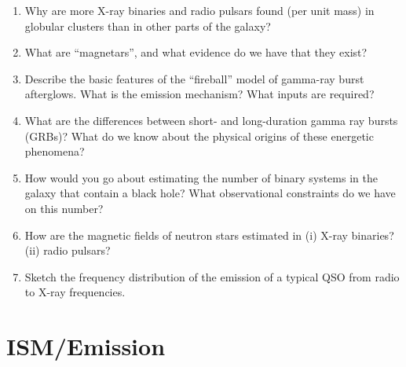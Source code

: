 \documentclass[11pt, oneside]{book}
\begin{document}
\begin{enumerate}[start=38, itemsep=0.4cm]
    \item Why are more X-ray binaries and radio pulsars found (per unit mass) in globular clusters than in other parts of the galaxy?
    \item What are ``magnetars'', and what evidence do we have that they exist?
    \item Describe the basic features of the ``fireball'' model of gamma-ray burst afterglows. What is the emission mechanism? What inputs are required?
    \item What are the differences between short- and long-duration gamma ray bursts (GRBs)? What do we know about the physical origins of these energetic phenomena?
    \item How would you go about estimating the number of binary systems in the galaxy that contain a black hole? What observational constraints do we have on this number?
    \item How are the magnetic fields of neutron stars estimated in (i) X-ray binaries? (ii) radio pulsars?
    \item Sketch the frequency distribution of the emission of a typical QSO from radio to X-ray frequencies.
\end{enumerate}

\section{ISM/Emission}
\end{document}
